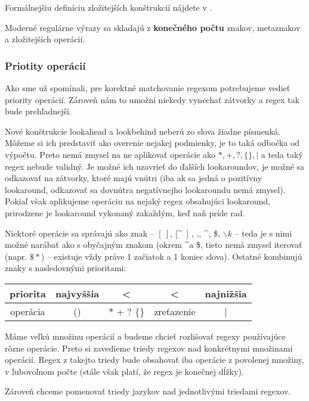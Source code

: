 Formálnejšiu definíciu zložitejších konštrukcií nájdete v \cite{mojaBak}.
\\ \par
Moderné regulárne výrazy sa skladajú z \textbf{konečného počtu} znakov, metaznakov a zložitejších operácií.

\subsubsection{Priotity operácií}

Ako sme už spomínali, pre korektné matchovanie regexom potrebujeme vedieť priority operácií. Zároveň nám to umožní niekedy vynechať zátvorky a regex tak bude prehľadnejší.

Nové konštrukcie lookahead a lookbehind neberú zo slova žiadne písmenká. Môžeme si ich predstaviť ako overenie nejakej podmienky, je to taká odbočka od výpočtu. Preto nemá zmysel na ne aplikovať operácie ako $*,+,?,\lbrace\rbrace,|$ a teda taký regex nebude validný. Je možné ich uzavrieť do ďalších lookaroundov, je možné sa odkazovať na zátvorky, ktoré majú vnútri (iba ak sa jedná o pozitívny lookaround, odkazovať sa dovnútra negatívnejho lookaroundu nemá zmysel). Pokiaľ však aplikujeme operáciu na nejaký regex obsahujúci lookaround, prirodzene je lookaround vykonaný zakaždým, keď naň príde rad.

Niektoré operácie sa správajú ako znak -- $\left[~\right]$, [\textasciicircum~] , ., \textasciicircum, \$, $\backslash k$ -- teda je s nimi možné narábať ako s obyčajným znakom (okrem \textasciicircum a \$, tieto nemá zmysel iterovať (napr. $\$*$) -- existuje vždy práve 1 začiatok a 1 koniec slova). Ostatné kombinujú znaky s nasledovnými prioritami:
\begin{center}
\begin{tabular}{|c||c|c|c|c|}
\hline
priorita &najvyššia&<&<& najnižšia  \\
\hline
operácia & () & $*$ + ? $\lbrace \rbrace$ & zreťazenie & | \\ \hline
\end{tabular}
\end{center}

Máme veľkú množinu operácií a budeme chcieť rozlišovať regexy používajúce rôzne operácie. Preto si zavedieme triedy regexov nad konkrétnymi množinami operácií. Regex z takejto triedy bude obsahovať iba operácie z povolenej množiny, v ľubovoľnom počte (stále však platí, že regex je konečnej dĺžky).

Zároveň chceme pomenovať triedy jazykov nad jednotlivými triedami regexov.

